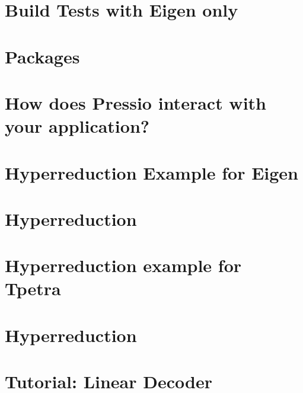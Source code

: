 \let\mypdfximage\pdfximage\def\pdfximage{\immediate\mypdfximage}\documentclass[twoside]{book}
\newcommand{\+}{\discretionary{\mbox{\scriptsize$\hookleftarrow$}}{}{}}
\begin{document}
\chapter{Build Tests with Eigen only}
\label{md_pages_getstarted_build_tests_eigen}

\chapter{Packages}
\label{md_pages_getstarted_packages}

\chapter{How does Pressio interact with your application?}
\label{md_pages_getstarted_pressio_app}

\chapter{Hyperreduction Example for Eigen}
\label{md_pages_hyperreduction_hyperred_eigen_example}

\chapter{Hyperreduction}
\label{md_pages_hyperreduction_hyperred_how_to_enable}

\chapter{Hyperreduction example for Tpetra}
\label{md_pages_hyperreduction_hyperred_tpetra_example}

\chapter{Hyperreduction}
\label{md_pages_hyperreduction}

\chapter{Tutorial\+: Linear Decoder}
\label{md_pages_tutorials_tutorial1}

\end{document}
